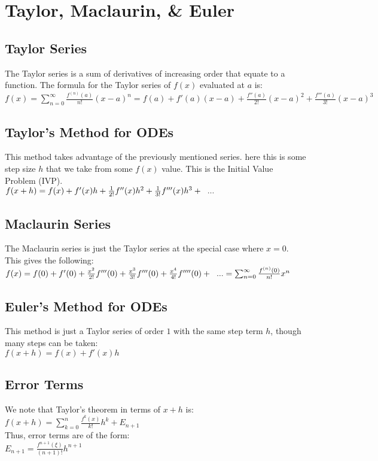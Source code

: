 \section{Taylor, Maclaurin, \& Euler}

\subsection*{Taylor Series}
The Taylor series is a sum of derivatives of increasing order that equate to a function. The formula for
the Taylor series of $f(x)$ evaluated at $a$ is:\\
$f(x) = \sum_{n=0}^{\infty} \frac{f^{(n)}(a)}{n!}(x - a)^n  = f(a) + f'(a)(x-a) + \frac{f''(a)}{2!} (x - a)^2 + \frac{f'''(a)}{3!} (x-a)^3 $\\

\subsection*{Taylor's Method for ODEs}
This method takes advantage of the previously mentioned series. here this is some
step size $h$ that we take from some $f(x)$ value. This is the Initial Value Problem (IVP).\\
$f(x + h) = f(x) + f'(x)h + \frac{1}{2!}f''(x)h^2 + \frac{1}{3!}f'''(x)h^3 + \hspace{2mm} ...$\\


\subsection*{Maclaurin Series}
The Maclaurin series is just the Taylor series at the special case where $x=0$.
This gives the following:\\
$f(x) = f(0) + f'(0) + \frac{x^2}{2!}f'''(0) + \frac{x^3}{3!}f'''(0) + \frac{x^4}{4!}f''''(0) + \hspace{2mm} ... = \sum_{n=0}^{\infty} \frac{f^{(n)}(0)}{n!}x^n$\\

\subsection*{Euler's Method for ODEs}
This method is just a Taylor series of order $1$ with the same step term $h$,
though many steps can be taken:\\
$ f(x + h) = f(x) + f'(x)h $\\

\subsection*{Error Terms}
We note that Taylor's theorem in terms of $x+h$ is:\\
$ f(x+h) = \sum_{k=0}^{n} \frac{f^{k}(x)}{k!}h^k + E_{n+1} $\\
Thus, error terms are of the form:\\
$ E_{n+1} = \frac{f^{n+1}(\xi)}{(n+1)!}h^{n+1}$\\

